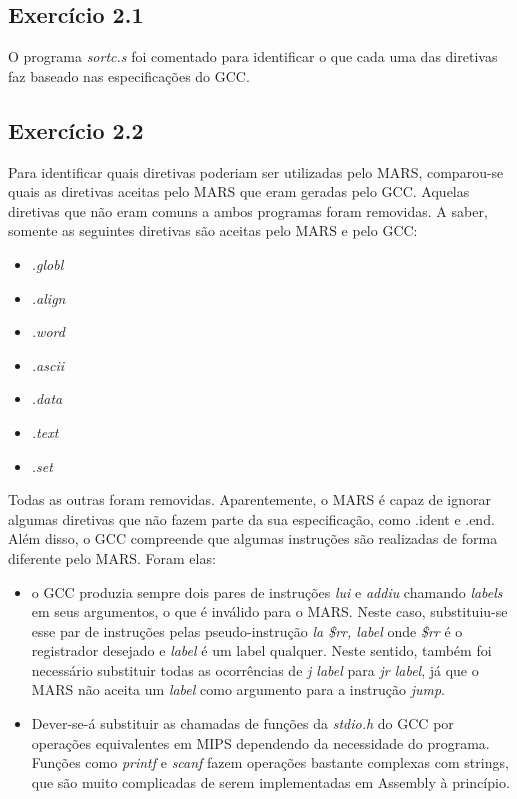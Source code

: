 \documentclass[12pt, a4paper, twoside]{article}
\begin{document}
\subsection{Exercício 2.1}

O programa \textit{sortc.s} foi comentado para identificar o que cada uma das diretivas faz baseado nas especificações do GCC.

\subsection{Exercício 2.2}

Para identificar quais diretivas poderiam ser utilizadas pelo MARS, comparou-se quais as diretivas aceitas pelo MARS que eram geradas pelo GCC. Aquelas diretivas que não eram comuns a ambos programas foram removidas. A saber, somente as seguintes diretivas são aceitas pelo MARS e pelo GCC:

\begin{itemize}
    \item \textit{.globl}
    \item \textit{.align}
    \item \textit{.word}
    \item \textit{.ascii}
    \item \textit{.data}
    \item \textit{.text}
    \item \textit{.set}
\end{itemize}

Todas as outras foram removidas. Aparentemente, o MARS é capaz de ignorar algumas diretivas que não fazem parte da sua especificação, como .ident e .end. Além disso, o GCC compreende que algumas instruções são realizadas de forma diferente pelo MARS. Foram elas:

\begin{itemize}
    \item o GCC produzia sempre dois pares de instruções \textit{lui} e \textit{addiu} chamando \textit{labels} em seus argumentos, o que é inválido para o MARS. Neste caso, substituiu-se esse par de instruções pelas pseudo-instrução \textit{la \$rr, label} onde \textit{\$rr} é o registrador desejado e \textit{label} é um label qualquer. Neste sentido, também foi necessário substituir todas as ocorrências de \textit{j label} para \textit{jr label}, já que o MARS não aceita um \textit{label} como argumento para a instrução \textit{jump}.
    \item Dever-se-á substituir as chamadas de funções da \textit{stdio.h} do GCC por operações equivalentes em MIPS dependendo da necessidade do programa. Funções como \textit{printf} e \textit{scanf} fazem operações bastante complexas com strings, que são muito complicadas de serem implementadas em Assembly à princípio.
\end{itemize}
\end{document}
